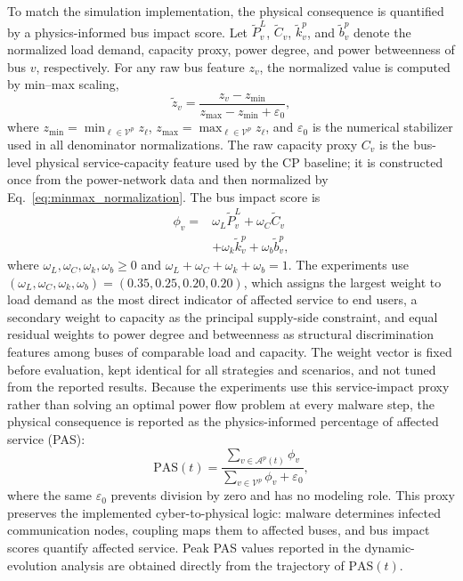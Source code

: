 \documentclass[lettersize,journal]{IEEEtran}
\begin{document}
To match the simulation implementation, the physical consequence is quantified by a physics-informed bus impact score. Let $\widetilde{P}^{L}_{v}$, $\widetilde{C}_{v}$, $\widetilde{k}^{p}_{v}$, and $\widetilde{b}^{p}_{v}$ denote the normalized load demand, capacity proxy, power degree, and power betweenness of bus $v$, respectively. For any raw bus feature $z_v$, the normalized value is computed by min--max scaling,
\begin{equation}
    \widetilde{z}_v
    =
    \frac{z_v-z_{\min}}{z_{\max}-z_{\min}+\varepsilon_0},
    \label{eq:minmax_normalization}
\end{equation}
where $z_{\min}=\min_{\ell\in\mathcal{V}^{p}}z_\ell$, $z_{\max}=\max_{\ell\in\mathcal{V}^{p}}z_\ell$, and $\varepsilon_0$ is the numerical stabilizer used in all denominator normalizations. The raw capacity proxy $C_v$ is the bus-level physical service-capacity feature used by the CP baseline; it is constructed once from the power-network data and then normalized by Eq.~\eqref{eq:minmax_normalization}. The bus impact score is
\begin{equation}
\begin{aligned}
    \phi_v
    =
    &\omega_L\widetilde{P}^{L}_{v}
    +\omega_C\widetilde{C}_{v}\\
    &+\omega_k\widetilde{k}^{p}_{v}
    +\omega_b\widetilde{b}^{p}_{v},
\end{aligned}
    \label{eq:bus_impact_score}
\end{equation}
where $\omega_L,\omega_C,\omega_k,\omega_b\geq0$ and $\omega_L+\omega_C+\omega_k+\omega_b=1$. The experiments use $(\omega_L,\omega_C,\omega_k,\omega_b)=(0.35,0.25,0.20,0.20)$, which assigns the largest weight to load demand as the most direct indicator of affected service to end users, a secondary weight to capacity as the principal supply-side constraint, and equal residual weights to power degree and betweenness as structural discrimination features among buses of comparable load and capacity. The weight vector is fixed before evaluation, kept identical for all strategies and scenarios, and not tuned from the reported results. Because the experiments use this service-impact proxy rather than solving an optimal power flow problem at every malware step, the physical consequence is reported as the physics-informed percentage of affected service (PAS):
\begin{equation}
    \mathrm{PAS}(t)
    =
    \frac{\sum_{v\in\mathcal{A}^{p}(t)}\phi_v}
    {\sum_{v\in\mathcal{V}^{p}}\phi_v+\varepsilon_0},
    \label{eq:pas}
\end{equation}
where the same $\varepsilon_0$ prevents division by zero and has no modeling role. This proxy preserves the implemented cyber-to-physical logic: malware determines infected communication nodes, coupling maps them to affected buses, and bus impact scores quantify affected service. Peak PAS values reported in the dynamic-evolution analysis are obtained directly from the trajectory of $\mathrm{PAS}(t)$.
\end{document}
